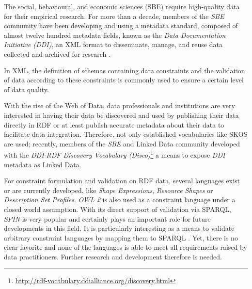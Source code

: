\documentclass{llncs}
\begin{document}

The social, behavioural, and economic sciences (SBE) require high-quality data for their empirical research. For more than a decade, members of the \emph{SBE} community have been developing and using a
metadata standard, composed of almost twelve hundred metadata fields, known as the \emph{Data Documentation Initiative (DDI)},
an XML format to disseminate, manage,
and reuse data collected and archived for research \cite{Vardigan2008}. 

In XML, the definition of schemas containing data constraints and the validation of data according to these constraints is commonly used to ensure a certain level of data quality.

With the rise of the Web of Data, data professionals and institutions are very interested in having their data be discovered and used by publishing their data directly in RDF or at least publish accurate metadata about their data to facilitate data integration. Therefore, not only established vocabularies like SKOS are used; 
recently, members of the \emph{SBE} and Linked Data community developed with the \emph{DDI-RDF Discovery Vocabulary (Disco)}\footnote{\url{http://rdf-vocabulary.ddialliance.org/discovery.html}} a means to expose \emph{DDI} metadata as Linked Data. 

For constraint formulation and validation on RDF data, several languages exist or are currently developed, like \emph{Shape Expressions}, \emph{Resource Shapes} or \emph{Description Set Profiles}. \emph{OWL 2} is also used as a constraint language under a closed world assumption. With its direct support of validation via SPARQL, \emph{SPIN}%
is very popular and certainly plays an important role for future developments in this field. It is particularly interesting as a means to validate arbitrary constraint languages by mapping them to SPARQL \cite{BoschEckert2014-2}. Yet, there is no clear favorite and none of the languages is able to meet all requirements raised by data practitioners. Further research and development therefore is needed.
\end{document}
